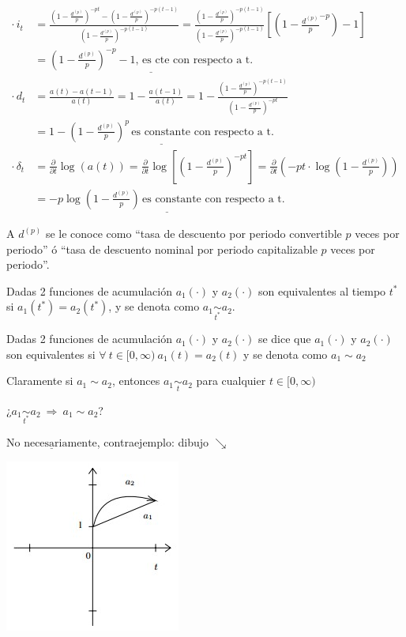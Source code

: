 \documentclass[
]{book}
\theoremstyle{definition}
\theoremstyle{definition}
\theoremstyle{definition}
\theoremstyle{definition}
\theoremstyle{remark}
\begin{document}
\begin{align*}
\cdot \, i_t &= \frac{\left(1 - \frac{d^{(p)}}{p}\right)^{-pt} - \left(1 - \frac{d^{(p)}}{p}\right)^{-p(t-1)}}{\left(1 - \frac{d^{(p)}}{p}\right)^{-p(t-1)}} = \frac{\left(1 - \frac{d^{(p)}}{p}\right)^{-p(t-1)}}{\left(1 - \frac{d^{(p)}}{p}\right)^{-p(t-1)}} \left[ \left(1 - \frac{d^{(p)}}{p}^{-p}\right) -1\right] \\
&= \underline{\left(1 - \frac{d^{(p)}}{p}\right)^{-p} -1 , \, \text{es cte con respecto a t.}} \\
\cdot \, d_t &= \frac{a(t)-a(t-1)}{a(t)} = 1 - \frac{a(t-1)}{a(t)} = 1- \frac{\left(1 - \frac{d^{(p)}}{p}\right)^{-p(t-1)}}{\left(1 - \frac{d^{(p)}}{p}\right)^{-pt}}\\
&= \underline{1-\left(1 - \frac{d^{(p)}}{p}\right)^{p}\, \text{es constante con respecto a t.}}\\
\cdot \, \delta_t &= \frac{\partial}{\partial t} \log(a(t)) = \frac{\partial}{\partial t}\log\left[\left(1 - \frac{d^{(p)}}{p}\right)^{-pt} \right] = \frac{\partial}{\partial t} \left( -pt\cdot\log\left(1 - \frac{d^{(p)}}{p}\right)\right)\\
&= \underline{-p\log\left(1 - \frac{d^{(p)}}{p}\right) \, \text{es constante con respecto a t.}} 
\end{align*}

A \textbf{{\(d^{(p)}\)}} se le conoce como {``tasa de descuento por periodo convertible \(p\) veces por periodo''} ó {``tasa de descuento nominal por periodo capitalizable \(p\) veces por periodo''}.

Dadas 2 funciones de acumulación \(a_1(\cdot)\) y \(a_2(\cdot)\) {son equivalentes al tiempo \(t^{*}\)} si {\(a_1(t^{*})= a_2(t^{*})\)}, y se denota como {\(a_1 \underset{t^{*}}{\sim }a_2\)}.

Dadas 2 funciones de acumulación \(a_1(\cdot)\) y \(a_2(\cdot)\) se dice que \(a_1(\cdot)\) y \(a_2(\cdot)\) {son equivalentes} si \(\forall \: t\in[0,\infty) \: a_1(t) = a_2(t)\) y se denota como {\(a_1 \sim a_2\)}

Claramente si \(a_1 \sim a_2\), entonces \(a_1 \underset{t}{\sim} a_2\) para cualquier \(t \in [0, \infty)\)

¿\(a_1\underset{t^{*}}{\sim} a_2\:\Longrightarrow \: a_1\sim a_2\)?

\(\underline{\text{No necesariamente}}\), contraejemplo: dibujo \(\searrow\)

\includegraphics{images/9.jpg}
\end{document}
